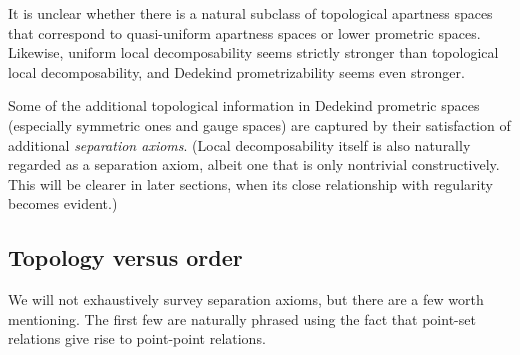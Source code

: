 \documentclass{article}
\begin{document}
It is unclear whether there is a natural subclass of topological apartness spaces that correspond to quasi-uniform apartness spaces or lower prometric spaces.
Likewise, uniform local decomposability seems strictly stronger than topological local decomposability, and Dedekind prometrizability seems even stronger.

Some of the additional topological information in Dedekind prometric spaces (especially symmetric ones and gauge spaces) are captured by their satisfaction of additional \emph{separation axioms}.
(Local decomposability itself is also naturally regarded as a separation axiom, albeit one that is only nontrivial constructively.
This will be clearer in later sections, when its close relationship with regularity becomes evident.)

\subsection{Topology versus order}
\label{sec:top-order}

We will not exhaustively survey separation axioms, but there are a few worth mentioning.
The first few are naturally phrased using the fact that point-set relations give rise to point-point relations.
\end{document}

